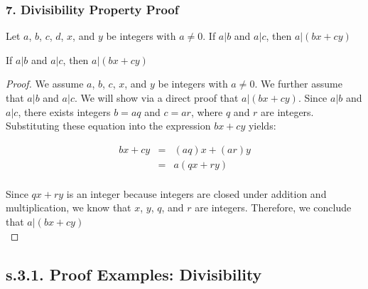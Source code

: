 \subsubsection*{7. Divisibility Property Proof}

Let $a$, $b$, $c$, $d$, $x$, and $y$ be integers with $a \neq 0$. If $a | b$ and $a | c$, then $a | (bx + cy)$ \\

\begin{tcolorbox}
	\begin{theorem}
		If $a | b$ and $a | c$, then $a |(bx + cy)$
	\end{theorem}
\end{tcolorbox}

\begin{proof}
We assume $a$, $b$, $c$, $x$, and $y$ be integers with $a \neq 0$. We further assume that $a | b$ and $a | c$. We will show via a direct proof that $a | (bx + cy)$. Since $a | b$ and $a | c$, there exists integers $b = aq$ and $c = ar$, where $q$ and $r$ are integers. Substituting these equation into the expression $bx + cy$ yields:

\begin{eqnarray*}
	bx + cy & = & (aq)x + (ar)y \nonumber \\	
	& = & a(qx + ry) \nonumber \\	
\end{eqnarray*}

Since $qx + ry$ is an integer because integers are closed under addition  and multiplication, we know that $x$, $y$, $q$, and $r$ are integers. Therefore, we conclude that $a | (bx + cy)$ \\
\end{proof}

\newpage
\subsection*{s.3.1. Proof Examples: Divisibility }

